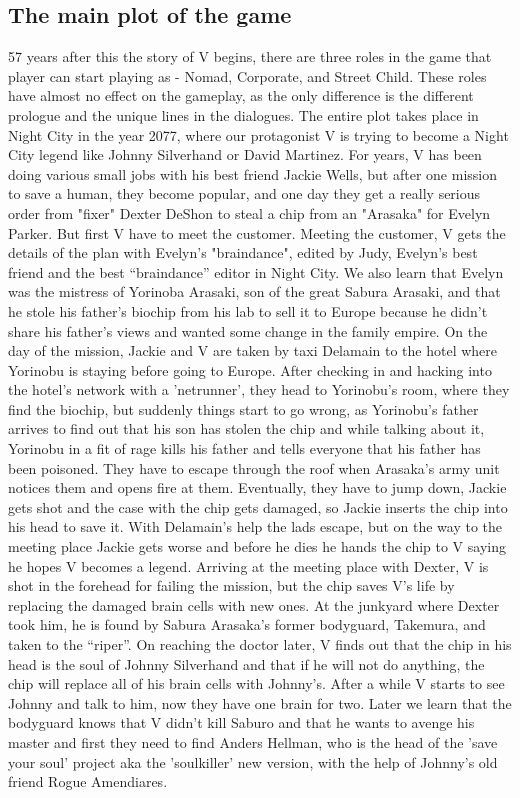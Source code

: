 \documentclass[10pt,twoside,english,a4paper]{article}
\begin{document}
\subsection{The main plot of the game}\label{plot}
	57 years after this the story of V begins, there are three roles in the game that player can start playing as - Nomad, Corporate, and Street Child. These roles have almost no effect on the gameplay, as the only difference is the different prologue and the unique lines in the dialogues. The entire plot takes place in Night City in the year 2077, where our protagonist V is trying to become a Night City legend like Johnny Silverhand or David Martinez. For years, V has been doing various small jobs with his best friend Jackie Wells, but after one mission to save a human, they become popular, and one day they get a really serious order from "fixer" Dexter DeShon to steal a chip from an "Arasaka" for Evelyn Parker. But first V have to meet the customer. Meeting the customer, V gets the details of the plan with Evelyn's "braindance", edited by Judy, Evelyn's best friend and the best “braindance” editor in Night City. We also learn that Evelyn was the mistress of Yorinoba Arasaki, son of the great Sabura Arasaki, and that he stole his father's biochip from his lab to sell it to Europe because he didn't share his father's views and wanted some change in the family empire. 
	On the day of the mission, Jackie and V are taken by taxi Delamain to the hotel where Yorinobu is staying before going to Europe. After checking in and hacking into the hotel's network with a 'netrunner', they head to Yorinobu's room, where they find the biochip, but suddenly things start to go wrong, as Yorinobu's father arrives to find out that his son has stolen the chip and while talking about it, Yorinobu in a fit of rage kills his father and tells everyone that his father has been poisoned. They have to escape through the roof when Arasaka's army unit notices them and opens fire at them. Eventually, they have to jump down, Jackie gets shot and the case with the chip gets damaged, so Jackie inserts the chip into his head to save it. With Delamain's help the lads escape, but on the way to the meeting place Jackie gets worse and before he dies he hands the chip to V saying he hopes V becomes a legend. Arriving at the meeting place with Dexter, V is shot in the forehead for failing the mission, but the chip saves V's life by replacing the damaged brain cells with new ones. At the junkyard where Dexter took him, he is found by Sabura Arasaka's former bodyguard, Takemura, and taken to the “riper”. On reaching the doctor later, V finds out that the chip in his head is the soul of Johnny Silverhand and that if he will not do anything, the chip will replace all of his brain cells with Johnny's. After a while V starts to see Johnny and talk to him, now they have one brain for two. Later we learn that the bodyguard knows that V didn't kill Saburo and that he wants to avenge his master and first they need to find Anders Hellman, who is the head of the 'save your soul' project aka the 'soulkiller' new version, with the help of Johnny's old friend Rogue Amendiares.
\end{document}
